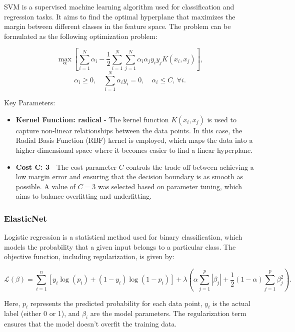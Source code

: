 SVM is a supervised machine learning algorithm used for classification and regression tasks. It aims to find the optimal hyperplane that maximizes the margin between different classes in the feature space. The problem can be formulated as the following optimization problem:

\[
\max_{\boldsymbol{\alpha}} \left[ \sum_{i=1}^N \alpha_i - \frac{1}{2} \sum_{i=1}^N \sum_{j=1}^N \alpha_i \alpha_j y_i y_j K(x_i, x_j) \right],
\]
\[
\alpha_i \geq 0,\quad\sum_{i=1}^N \alpha_i y_i = 0,\quad\alpha_i \leq C,\,\forall i.
\]

Key Parameters:

\begin{itemize} 
    \item \textbf{Kernel Function: radical} - The kernel function $K(x_i, x_j)$ is used to capture non-linear relationships between the data points. In this case, the Radial Basis Function (RBF) kernel is employed, which maps the data into a higher-dimensional space where it becomes easier to find a linear hyperplane.
    \item \textbf{Cost C: 3} - The cost parameter $C$ controls the trade-off between achieving a low margin error and ensuring that the decision boundary is as smooth as possible. A value of $C=3$ was selected based on parameter tuning, which aims to balance overfitting and underfitting.
\end{itemize}


\subsubsection{ElasticNet}

Logistic regression is a statistical method used for binary classification, which models the probability that a given input belongs to a particular class. The objective function, including regularization, is given by:

\[
\mathcal{L}(\beta) = \sum_{i=1}^{n} \left[ y_i \log(p_i) + (1 - y_i) \log(1 - p_i) \right]+ \lambda \left( \alpha \sum_{j=1}^{p} |\beta_j| + \frac{1}{2} (1 - \alpha) \sum_{j=1}^{p} \beta_j^2 \right).
\]

Here, $p_i$ represents the predicted probability for each data point, $y_i$ is the actual label (either 0 or 1), and $\beta_i$ are the model parameters. The regularization term ensures that the model doesn't overfit the training data.

